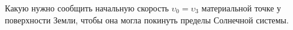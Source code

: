 Какую нужно сообщить начальную скорость $\upsilon_0=\upsilon_3$ материальной точке у поверхности Земли, чтобы она могла 
покинуть пределы Солнечной системы.